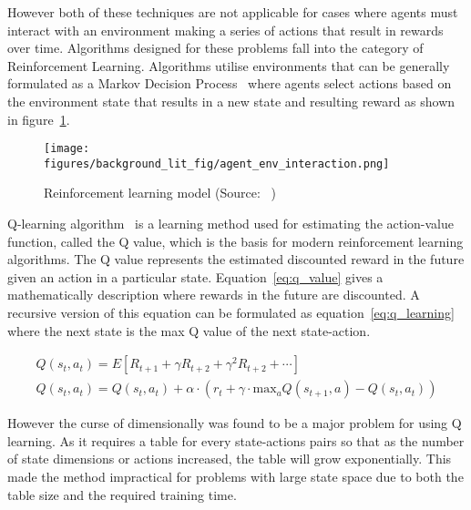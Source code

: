 However both of these techniques are not applicable for cases where agents must interact with an environment making a
series of actions that result in rewards over time. Algorithms designed for these problems fall into the category of
Reinforcement Learning. Algorithms utilise environments that can be generally formulated as a Markov Decision
Process~\citep{Bel} where agents select actions based on the environment state that results in a new state and resulting
reward as shown in figure~\ref{fig:reinforcement_learning}.

\begin{figure}[h]
    \centering
    \texttt{[image: figures/background\_lit\_fig/agent\_env\_interaction.png]}
    \caption{Reinforcement learning model (Source: ~\cite{Sutton1998})}
    \label{fig:reinforcement_learning}
\end{figure}

Q-learning algorithm~\cite{watkins1992q-learning} is a learning method used for estimating the action-value function,
called the Q value, which is the basis for modern reinforcement learning algorithms. The Q value represents the estimated
discounted reward in the future given an action in a particular state. Equation~\eqref{eq:q_value} gives a
mathematically description where rewards in the future are discounted. A recursive version of this equation can be
formulated as equation~\eqref{eq:q_learning} where the next state is the max Q value of the next state-action.

\begin{align}
    Q(s_t, a_t) = E[R_{t+1} + \gamma R_{t+2} + \gamma^2 R_{t+2} + \cdots ] \label{eq:q_value} \\
    Q(s_t, a_t) = Q(s_t, a_t) + \alpha \cdot (r_t + \gamma \cdot \text{max}_a Q(s_{t+1} , a) - Q(s_t, a_t) ) \label{eq:q_learning}
\end{align}

However the curse of dimensionally was found to be a major problem for using Q learning. As it requires a table for
every state-actions pairs so that as the number of state dimensions or actions increased, the table will grow
exponentially. This made the method impractical for problems with large state space due to both the table
size and the required training time.

